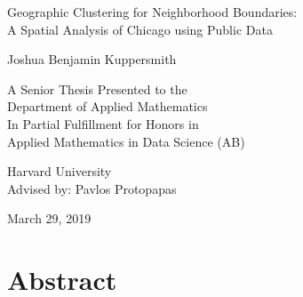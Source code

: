 \documentclass[times new roman,12pt]{article}
\begin{document}
\begin{titlepage}
   \begin{center}
      \large{Geographic Clustering for Neighborhood Boundaries:\\}
      \large{A Spatial Analysis of Chicago using Public Data}
      \vspace{16mm}
      
      \normalsize{Joshua Benjamin Kuppersmith}
      
      \vspace{16mm}
      
      \normalsize{A Senior Thesis Presented to the\\Department of Applied Mathematics\\In Partial Fulfillment for Honors in\\Applied Mathematics in Data Science (AB)}
      
      \vspace{16mm}
      
      \normalsize{Harvard University\\Advised by: Pavlos Protopapas}
      
      \vspace{16mm}
      
      \normalsize{March 29, 2019}
      
   \end{center}
\end{titlepage}


\newpage

\renewcommand{\contentsname}{Table of Contents}
\tableofcontents

\newpage

\section{Abstract}
\end{document}
